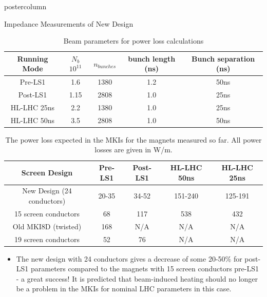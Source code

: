 \documentclass[final,hyperref={pdfpagelabels=false}]{beamer}
\begin{document}
\begin{frame}
\begin{columns}
\begin{column}{.49\textwidth}
\begin{beamercolorbox}[center,wd=\textwidth]{postercolumn}
\begin{minipage}[T]{.95\textwidth}
{\begin{block}{Impedance Measurements of New Design}
\begin{table}
\label{tab:beamPar}
\caption{Beam parameters for power loss calculations}
\begin{center}
\begin{tabular}{c | c | c | c | c}
\small{Running Mode} & $N_{b}$ $10^{11}$ & $n_{bunches}$ & bunch length (ns) & Bunch separation (ns) \\ \hline 
\small{Pre-LS1} & 1.6 & 1380 & 1.2 & 50ns \\ \hline
\small{Post-LS1} & 1.15 & 2808 & 1.0 & 25ns \\ \hline
\small{HL-LHC 25ns}& 2.2 & 1380 & 1.0 & 25ns \\ \hline
\small{HL-LHC 50ns}& 3.5 & 2808 & 1.0 & 50ns \\
\end{tabular}
\end{center}
\end{table}

\begin{table}
\label{tab:heating-mki-screen-designs}
\caption{\small{The power loss expected  in the MKIs for the magnets measured so far. All power losses are given in W/m.}}
\begin{center}
\begin{tabular}{c | c | c | c | c}
\small{Screen Design} & \small{Pre-LS1} & \small{Post-LS1} & \small{HL-LHC 50ns} & \small{HL-LHC 25ns} \\ \hline 
\small{New Design (24 conductors)} & 20-35 & 34-52 & 151-240 & 125-191 \\ \hline
\small{15 screen conductors} & 68 & 117 & 538 & 432 \\ \hline
\small{Old MKI8D (twisted)} & 168 & N/A & N/A & N/A \\ \hline
\small{19 screen conductors} & 52 & 76 & N/A & N/A \\
\end{tabular}
\end{center}
\end{table}
\begin{itemize}
\item{The new design with 24 conductors gives a decrease of some 20-50\% for post-LS1 parameters compared to the magnets with 15 screen conductors pre-LS1 - a great success! It is predicted that beam-induced heating should no longer be a problem in the MKIs for nominal LHC parameters in this case.}
\end{itemize}


\end{block}}
\end{minipage}
\end{beamercolorbox}
\end{column}
\end{columns}
\end{frame}
\end{document}

